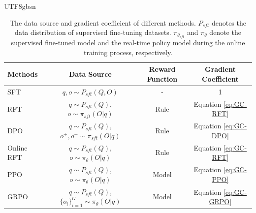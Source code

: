 \documentclass[11pt, a4paper, logo, copyright, nonumbering]{deepseek}
\begin{document}
\begin{CJK*}{UTF8}{gbsn}
\begin{table}[t]
    \centering
    \begin{small}
    \begin{tabular}{lccc}
    \toprule
     \textbf{Methods} & \textbf{Data Source}  & \textbf{Reward Function} & \textbf{Gradient Coefficient}  \\
    \midrule
    SFT & $q, o \sim P_{sft}(Q, O)$& - &  1 \\
    \midrule
    RFT  & $q \sim P_{sft}(Q)$, $o \sim \pi_{sft}(O|q)$ & Rule & Equation \ref{eq:GC-RFT} \\
     DPO & $q \sim P_{sft}(Q)$, $o^+, o^- \sim \pi_{sft}(O|q)$ & Rule & Equation \ref{eq:GC-DPO} \\
    \midrule
    Online RFT  & $q \sim P_{sft}(Q)$, $o \sim \pi_{\theta}(O|q)$ & Rule & Equation \ref{eq:GC-RFT} \\
    PPO & $q \sim P_{sft}(Q)$, $o \sim \pi_{\theta}(O|q)$ & Model & Equation \ref{eq:GC-PPO} \\
    GRPO & $q \sim P_{sft}(Q)$, $\{o_i\}_{i=1}^G \sim \pi_{\theta}(O|q)$ & Model & Equation \ref{eq:GC-GRPO} \\
    \bottomrule
    \end{tabular}
    \end{small}
    \caption{The data source and gradient coefficient of different methods. $P_{sft}$ denotes the data distribution of supervised fine-tuning datasets. $\pi_{\theta_{sft}}$ and $\pi_{\theta}$ denote the supervised fine-tuned model and the real-time policy model during the online training process, respectively.}
    \label{tab:data_policy}
\end{table}


\end{CJK*}
\end{document}
